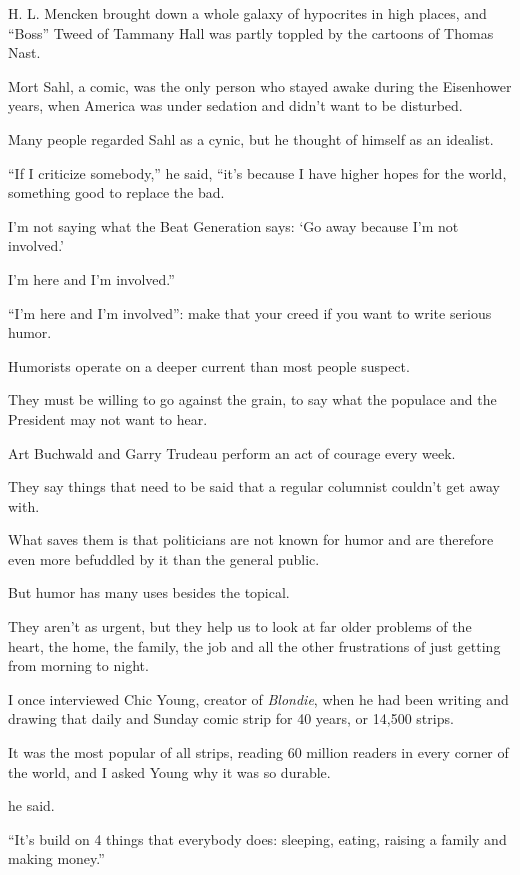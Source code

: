 \documentclass{book}
\numberwithin{equation}{section}
\begin{document}
H. L. Mencken brought down a whole galaxy of hypocrites in high places, and ``Boss'' Tweed of Tammany Hall was partly toppled by the cartoons of Thomas Nast.

Mort Sahl, a comic, was the only person who stayed awake during the Eisenhower years, when America was under sedation and didn't want to be disturbed.

Many people regarded Sahl as a cynic, but he thought of himself as an idealist.

``If I criticize somebody,'' he said, ``it's because I have higher hopes for the world, something good to replace the bad.

I'm not saying what the Beat Generation says: `Go away because I'm not involved.'

I'm here and I'm involved.''

%
``I'm here and I'm involved'': make that your creed if you want to write serious humor.

Humorists operate on a deeper current than most people suspect.

They must be willing to go against the grain, to say what the populace and the President may not want to hear.

Art Buchwald and Garry Trudeau perform an act of courage every week.

They say things that need to be said that a regular columnist couldn't get away with.

What saves them is that politicians are not known for humor and are therefore even more befuddled by it than the general public.

%
But humor has many uses besides the topical.

They aren't as urgent, but they help us to look at far older problems of the heart, the home, the family, the job and all the other frustrations of just getting from morning to night.

I once interviewed Chic Young, creator of \textit{Blondie}, when he had been writing and drawing that daily and Sunday comic strip for 40 years, or 14,500 strips.

It was the most popular of all strips, reading 60 million readers in every corner of the world, and I asked Young why it was so durable.

%
 he said.

``It's build on 4 things that everybody does: sleeping, eating, raising a family and making money.''
\end{document}

